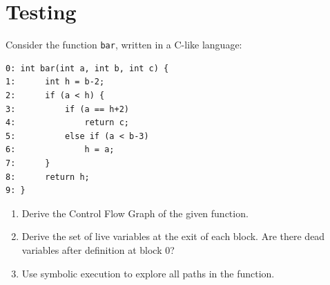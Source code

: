 \section{Testing}

Consider the function \texttt{bar}, written in a C-like language:
\begin{lstlisting}[style=C]
0: int bar(int a, int b, int c) {
1:      int h = b-2;
2:      if (a < h) {
3:          if (a == h+2)
4:              return c;
5:          else if (a < b-3)
6:              h = a;
7:      }
8:      return h; 
9: } 
\end{lstlisting}
\begin{enumerate}
    \item Derive the Control Flow Graph of the given function.
    \item Derive the set of live variables at the exit of each block.
        Are there dead variables after definition at block 0?
    \item Use symbolic execution to explore all paths in the function. 
\end{enumerate}

